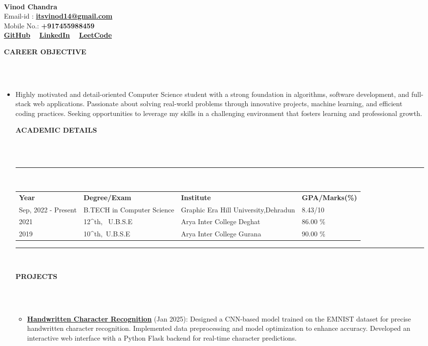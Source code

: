 \documentclass[a4paper,10pt]{article}
\newcommand{\lsep}{-0.5cm}
\newcommand{\resheading}[1]{{\small \colorbox{mygrey}{\begin{minipage}{0.975\textwidth}{\textbf{#1 \vphantom{p\^{E}}}}\end{minipage}}}}
\begin{document}
\hspace{0.5cm}\\[-0.2cm]

\textbf{Vinod Chandra} \\
\indent Email-id : \textbf{\url{itsvinod14@gmail.com}} \\
\indent Mobile No.: \textbf{+917455988459} \\
\indent \textbf{\href{https://github.com/VinodPandey14}{GitHub}} \ \ \textbf{\href{https://www.linkedin.com/in/vinod-pandey14/}{LinkedIn}} \ \ \textbf{\href{https://leetcode.com/u/Vinod-Pandey/}{LeetCode}} \\

\resheading{\textbf{CAREER OBJECTIVE} }\\[\lsep]
\\
\begin{itemize}
\setlength\itemsep{0.5em}
\item Highly motivated and detail-oriented Computer Science student with a strong foundation in algorithms, software development, and full-stack web applications. Passionate about solving real-world problems through innovative projects, machine learning, and efficient coding practices. Seeking opportunities to leverage my skills in a challenging environment that fosters learning and professional growth.

\resheading{\textbf{ACADEMIC DETAILS} }\\[\lsep]
\\
\indent \rule{6.8in}{0.4pt}\\
\indent \begin{tabular}{ l @{\hskip 0.15in} l @{\hskip 0.15in} l @{\hskip 0.15in} l @{\hskip 0.15in} }
\noindent \textbf{Year} & \textbf{Degree/Exam} & \textbf{Institute} & \textbf{GPA/Marks(\%)}\\
Sep, 2022 - Present & B.TECH in Computer Science & Graphic Era Hill University,Dehradun & 8.43/10\\
2021 & 12^{th}, \ U.B.S.E & Arya Inter College Deghat & 86.00 \% \\
2019 & 10^{th},\ U.B.S.E & Arya Inter College Gurana & 90.00 \%\\
\end{tabular}
\indent \rule{6.8in}{0.4pt}
\\

\resheading{\textbf{PROJECTS} }\\[\lsep]
\\
\begin{itemize}
\setlength\itemsep{0.5em}
\item \textbf{\href{https://github.com/VinodPandey14/Handwritten-Character-Recognition}{Handwritten Character Recognition}} (Jan 2025):   Designed a CNN-based model trained on the EMNIST dataset for precise handwritten character recognition. Implemented data preprocessing and model optimization to enhance accuracy. Developed an interactive web interface with a Python Flask backend for real-time character predictions.


\end{itemize}
\end{itemize}
\end{document}
